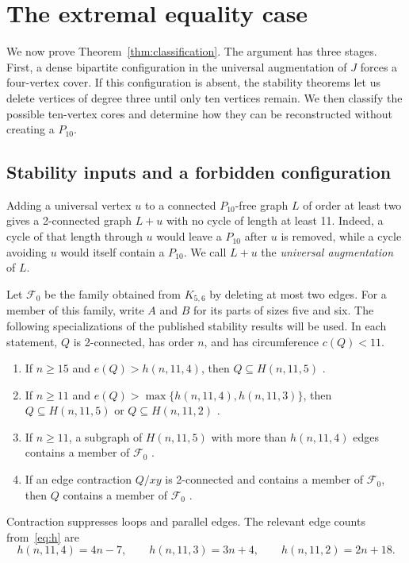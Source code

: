 \documentclass[12pt]{article}
\newcommand{\Fzero}{\mathcal F_0}
\begin{document}
\section{The extremal equality case}\label{sec:classification}

We now prove Theorem~\ref{thm:classification}. The argument has
three stages. First, a dense bipartite configuration in the
universal augmentation of $J$ forces a four-vertex cover.
If this configuration is absent, the stability theorems let us
delete vertices of degree three until only ten vertices remain.
We then classify the possible ten-vertex cores and determine how
they can be reconstructed without creating a $P_{10}$.

\subsection{Stability inputs and a forbidden configuration}

Adding a universal vertex $u$ to a connected $P_{10}$-free graph
$L$ of order at least two gives a 2-connected graph $L+u$
with no cycle of length at
least 11. Indeed, a cycle of that length through $u$ would
leave a $P_{10}$ after $u$ is removed, while a cycle avoiding
$u$ would itself contain a $P_{10}$. We call $L+u$ the
\emph{universal augmentation} of $L$.

Let $\Fzero$ be the family obtained from $K_{5,6}$ by deleting
at most two edges. For a member of this family, write $A$ and
$B$ for its parts of sizes five and six.
The following specializations of the published stability
results will be used. In each statement, $Q$ is 2-connected,
has order $n$, and has circumference $c(Q)<11$.
\begin{enumerate}
\item If $n\geq15$ and $e(Q)>h(n,11,4)$, then
$Q\subseteq H(n,11,5)$ \cite[Theorem~1.4]{fkv}.
\item If $n\geq11$ and
$e(Q)>\max\{h(n,11,4),h(n,11,3)\}$, then
$Q\subseteq H(n,11,5)$ or $Q\subseteq H(n,11,2)$
\cite[Theorem~2.3]{fkvl}.
\item If $n\geq11$, a subgraph of $H(n,11,5)$ with more
than $h(n,11,4)$ edges contains a member of $\Fzero$
\cite[Lemma~4.6]{fkvl}.
\item If an edge contraction $Q/xy$ is 2-connected and
contains a member of $\Fzero$, then $Q$ contains a member
of $\Fzero$ \cite[Lemma~4.9]{fkv}.
\end{enumerate}
Contraction suppresses loops and parallel edges. The relevant
edge counts from~\eqref{eq:h} are
\begin{equation}\label{eq:thresholds}
 h(n,11,4)=4n-7,\qquad h(n,11,3)=3n+4,\qquad
 h(n,11,2)=2n+18.
\end{equation}
\end{document}
